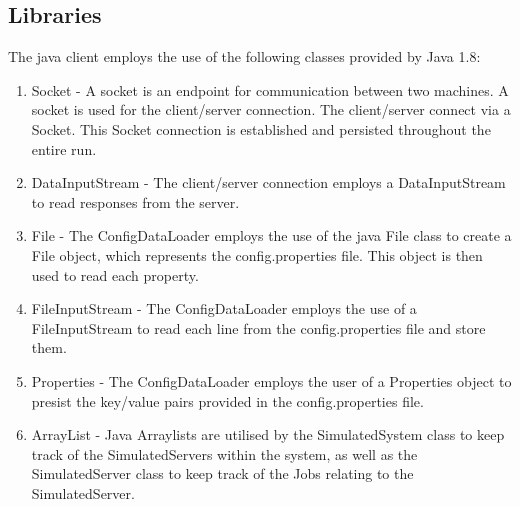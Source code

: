 \documentclass[a4paper]{article}
\begin{document}
\subsection{Libraries}
The java client employs the use of the following classes provided by Java 1.8:
\begin{enumerate}
  \item Socket - A socket is an endpoint for communication between two machines. A socket is used for the client/server connection. The client/server connect via a Socket. This Socket connection is established and persisted throughout the entire run.
  \item DataInputStream - The client/server connection employs a DataInputStream to read responses from the server.
  \item File - The ConfigDataLoader employs the use of the java File class to create a File object, which represents the config.properties file. This object is then used to read each property.
  \item FileInputStream - The ConfigDataLoader employs the use of a FileInputStream to read each line from the config.properties file and store them.
  \item Properties - The ConfigDataLoader employs the user of a Properties object to presist the key/value pairs provided in the config.properties file.
  \item ArrayList - Java Arraylists are utilised by the SimulatedSystem class to keep track of the SimulatedServers within the system, as well as the SimulatedServer class to keep track of the Jobs relating to the SimulatedServer.
\end{enumerate}
\end{document}

